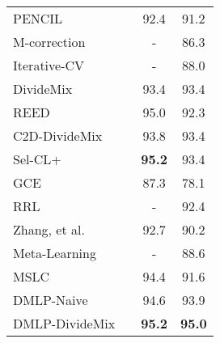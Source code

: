 \documentclass[10pt,twocolumn,letterpaper]{article}
\newcommand{\red}[1]{{#1}}
\begin{document}
\begin{table}
\begin{tabular}{p{3.2cm} |c |cc}
        PENCIL~\cite{yi2019probabilistic}       &    \red{{\XSolidBrush}}     & 92.4   & 91.2 \\ 
M-correction~\cite{arazo2019unsupervised}   &  \red{{\XSolidBrush}}   &  -      & 86.3 \\ 
        Iterative-CV~\cite{chen2019understanding}    &  \red{{\XSolidBrush}}  &  -      & 88.0 \\ 
        DivideMix~\cite{li2020dividemix}  & \red{{\XSolidBrush}}  & 93.4    & 93.4 \\ 
        REED ~\cite{zhang2020decoupling}       &    \red{{\XSolidBrush}}      & {95.0}    & {92.3}    \\
        C2D-DivideMix ~\cite{zheltonozhskii2022contrast}     &       \red{{\XSolidBrush}}     &{93.8}    & {93.4}    \\
        Sel-CL+ ~\cite{li2022selective}       &      \red{{\XSolidBrush}}    & \textbf{95.2}    & {93.4}    \\
        GCE ~\cite{ghosh2021contrastive}      &      \red{{\XSolidBrush}}     & {87.3}    & {78.1}    \\
        RRL ~\cite{li2021learning}           &   \red{{\XSolidBrush}}   & -    & {92.4}    \\ 
        \midrule
        Zhang, et al.~\cite{zhang2020distilling}   &   \red{{\CheckmarkBold}}    & 92.7    & 90.2 \\
        Meta-Learning~\cite{MLNT}                &    \red{{\CheckmarkBold}}     &  -      & 88.6 \\ 
        MSLC ~\cite{AAAI-2021-meta} & \red{{\CheckmarkBold}}  &  94.4       & 91.6\\ 
        \midrule
        DMLP-Naive                      &          \red{{\CheckmarkBold}}            & 94.6    &93.9    \\
        DMLP-DivideMix                      &          \red{{\CheckmarkBold}}            & \textbf{95.2}    & \textbf{95.0}    \\
        \bottomrule
    \end{tabular}
    \label{tab:cifar10asy}
    \end{table}
    
\end{document}

